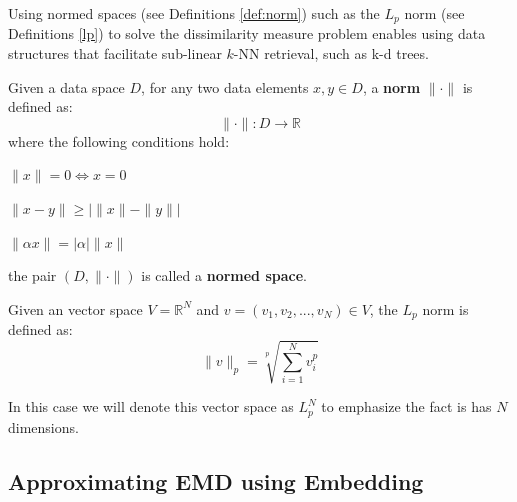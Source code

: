 \iftoggle{edit-mode}{\hspace{0pt}\marginpar{$L_p$ advantage and drawbacks}}{}
Using normed spaces (see Definitions \ref{def:norm}) such as the $L_p$ norm (see Definitions \ref{lp}) to solve the dissimilarity measure problem enables using data structures that facilitate sub-linear $k$-NN retrieval, such as k-d trees.

\begin{definition}
Given a data space $D$, for any two data elements  $x,y \in D$, a \textbf{norm} $\|\cdot\|$ is defined as:
\begin{equation}
\|\cdot\|: D \longrightarrow \mathbb{R}
\end{equation}
where the following conditions hold:
\begin{compactitem}
\item $\|x\|=0 \Leftrightarrow x=0$
\item $\|x-y\| \geq|\|x\|-\|y\||$
\item $\|\alpha x\|=|\alpha|\|x\|$
\end{compactitem}
the pair $\left(D,\|\cdot\|\right)$ is called a \textbf{normed space}.
\label{def:norm}
\end{definition}


\begin{definition}
Given an vector space $V=\mathbb{R}^N$ and $v=(v_1,v_2,...,v_N) \in V$, the $L_p$ norm is defined as:
\begin{equation}
\|v\|_p=\sqrt[p]{\sum\limits_{i=1}^N v_i^p}
\end{equation}
\label{lp}
\end{definition}
In this case we will denote this vector space as $L_p^N$ to emphasize the fact is has $N$ dimensions.

\subsection{Approximating EMD using Embedding}
\label{subsec:approximating_emd_using_embedding}

